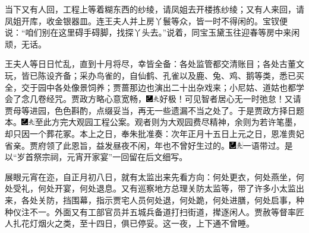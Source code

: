 当下又有人回，工程上等着糊东西的纱绫，请凤姐去开楼拣纱绫；又有人来回，请凤姐开库，收金银器皿。连王夫人并上房丫鬟等众，皆一时不得闲的。宝钗便说：“咱们别在这里碍手碍脚，找探丫头去。”说着，同宝玉黛玉往迎春等房中来闲顽，无话。

王夫人等日日忙乱，直到十月将尽，幸皆全备：各处监管都交清账目；各处古董文玩，皆已陈设齐备；采办鸟雀的，自仙鹤、孔雀以及鹿、兔、鸡、鹅等类，悉已买全，交于园中各处像景饲养；贾蔷那边也演出二十出杂戏来；小尼姑、道姑也都学会了念几卷经咒。贾政方略心意宽畅，{\includegraphics[width=3mm]{../Images/00003}\includegraphics[width=3mm]{../Images/00012}\footnotesize \kaishu 好极！可见智者居心无一时弛怠！}又请贾母等进园，色色斟酌，点缀妥当，再无一些遗漏不当之处了。于是贾政方择日题本。{\includegraphics[width=3mm]{../Images/00003}\includegraphics[width=3mm]{../Images/00012}\footnotesize \kaishu 至此方完大观园工程公案。观者则为大观园费尽精神，余则为若许笔墨，却只因一个葬花冢。}本上之日，奉朱批准奏：次年正月十五日上元之日，恩准贵妃省亲。贾府领了此恩旨，益发昼夜不闲，年也不曾好生过的。{\includegraphics[width=3mm]{../Images/00003}\includegraphics[width=3mm]{../Images/00012}\footnotesize \kaishu 一语带过。是以“岁首祭宗祠，元宵开家宴”一回留在后文细写。}

展眼元宵在迩，自正月初八日，就有太监出来先看方向：何处更衣，何处燕坐，何处受礼，何处开宴，何处退息。又有巡察地方总理关防太监等，带了许多小太监出来，各处关防，挡围幕，指示贾宅人员何处退，何处跪，何处进膳，何处启事，种种仪注不一。外面又有工部官员并五城兵备道打扫街道，撵逐闲人。贾赦等督率匠人扎花灯烟火之类，至十四日，俱已停妥。这一夜，上下通不曾睡。

